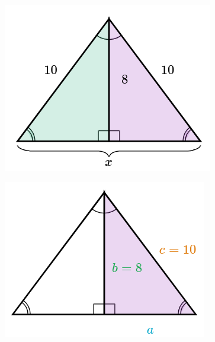 \begin{solutionbox}{15cm}
    \begin{minipage}{0.2\textwidth}
        \begin{figure}[H]
            \centering
            \includegraphics[width=0.9\linewidth]{../images/pitagoras6a.png}
            \caption{}
            \label{fig:pitagoras_6a}
        \end{figure}
        \begin{figure}[H]
            \centering
            \includegraphics[width=0.9\linewidth]{../images/pitagoras6b.png}
            \caption{}
            \label{fig:pitagoras_6b}
        \end{figure}
        \begin{figure}[H]
            \centering

\end{figure}
\end{minipage}
\end{solutionbox}
